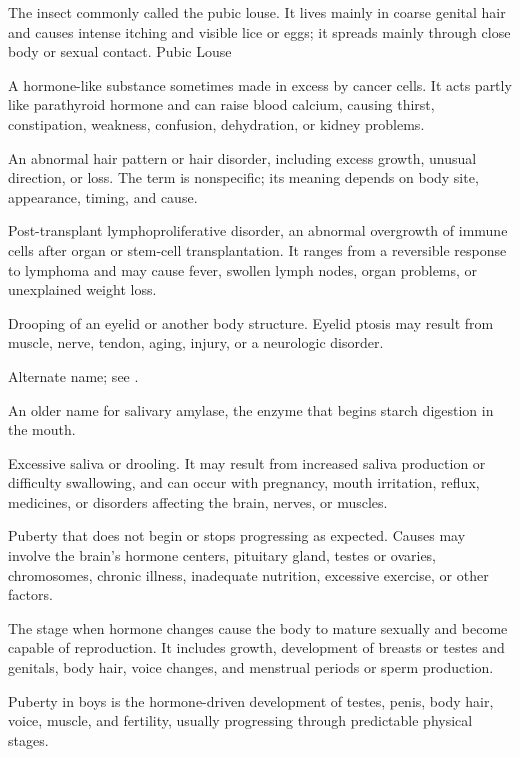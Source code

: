  The insect commonly called the pubic louse. It lives mainly in coarse genital hair and causes intense itching and visible lice or eggs; it spreads mainly through close body or sexual contact.
\synonyms
Pubic Louse

 A hormone-like substance sometimes made in excess by cancer cells. It acts partly like parathyroid hormone and can raise blood calcium, causing thirst, constipation, weakness, confusion, dehydration, or kidney problems.

 An abnormal hair pattern or hair disorder, including excess growth, unusual direction, or loss. The term is nonspecific; its meaning depends on body site, appearance, timing, and cause.

 Post-transplant lymphoproliferative disorder, an abnormal overgrowth of immune cells after organ or stem-cell transplantation. It ranges from a reversible response to lymphoma and may cause fever, swollen lymph nodes, organ problems, or unexplained weight loss.

 Drooping of an eyelid or another body structure. Eyelid ptosis may result from muscle, nerve, tendon, aging, injury, or a neurologic disorder.

 Alternate name; see .

 An older name for salivary amylase, the enzyme that begins starch digestion in the mouth.

 Excessive saliva or drooling. It may result from increased saliva production or difficulty swallowing, and can occur with pregnancy, mouth irritation, reflux, medicines, or disorders affecting the brain, nerves, or muscles.

 Puberty that does not begin or stops progressing as expected. Causes may involve the brain’s hormone centers, pituitary gland, testes or ovaries, chromosomes, chronic illness, inadequate nutrition, excessive exercise, or other factors.

 The stage when hormone changes cause the body to mature sexually and become capable of reproduction. It includes growth, development of breasts or testes and genitals, body hair, voice changes, and menstrual periods or sperm production.

 Puberty in boys is the hormone-driven development of testes, penis, body hair, voice, muscle, and fertility, usually progressing through predictable physical stages.

